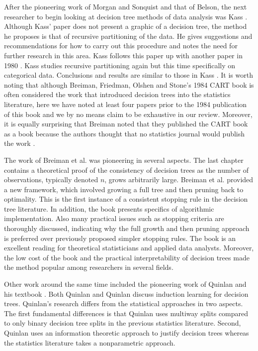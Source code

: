 After the pioneering work of Morgan and Sonquist and that of Belson, the next researcher to begin looking at decision tree methods of data analysis was Kass \cite{kass1975significance}. Although Kass' paper does not present a graphic of a decision tree, the method he proposes is that of recursive partitioning of the data. He gives suggestions and recommendations for how to carry out this procedure and notes the need for further research in this area. Kass follows this paper up with another paper in 1980 \cite{kass1980exploratory}. Kass \cite{kass1980exploratory} studies recursive partitioning again but this time specifically on categorical data. Conclusions and results are similar to those in Kass \cite{kass1975significance}. It is worth noting that although Breiman, Friedman, Olshen and Stone's 1984 CART book \cite{breiman1984classification} is often considered the work that introduced decision trees into the statistics literature, here we have noted at least four papers prior to the 1984 publication of this book and we by no means claim to be exhaustive in our review.  Moreover, it is equally surprising that Breiman noted that they published the CART book as a book because the authors thought that no statistics journal would publish the work \cite{friedman2011remembering}.  

The work of Breiman et al. \cite{breiman1984classification} was pioneering in several aspects. The last chapter contains a theoretical proof of the consistency of decision trees as the number of observations, typically denoted $n$, grows arbitrarily large. Breiman et al. provided a new framework, which involved growing a full tree and then pruning back to optimality. This is the first instance of a consistent stopping rule in the decision tree literature. In addition, the book presents specifics of algorithmic implementation. Also many practical issues such as stopping criteria are thoroughly discussed, indicating why the full growth and then pruning approach is preferred over previously proposed simpler stopping rules. The book is an excellent reading for theoretical statisticians and applied data analysts. Moreover, the low cost of the book and the practical interpretability of decision trees made the method popular among researchers in several fields.

Other work around the same time included the pioneering work of Quinlan \cite{quinlan1986induction} and his textbook \cite{quinlan1993c4}. Both Quinlan \cite{quinlan1986induction} and Quinlan \cite{quinlan1993c4} discuss induction learning for decision trees. Quinlan's research differs from the statistical approaches in two aspects. The first fundamental differences is that Quinlan uses multiway splits compared to only binary decision tree splits in the previous statistics literature. Second, Quinlan uses an information theoretic approach to justify decision trees whereas the statistics literature takes a nonparametric approach.  

